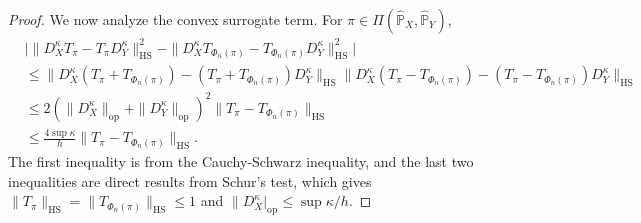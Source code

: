 \documentclass{article}
\begin{document}
\begin{proof}
	We now analyze the convex surrogate term. For $\pi \in \Pi(\hat{\mathbb{P}}_X,\hat{\mathbb{P}}_Y)$,
	\begin{align*}
		&\Big\vert \|D_X^\kappa T_{\pi} - T_{\pi} D_Y^\kappa \|_{\mathrm{HS}}^2 - \|D_X^\kappa T_{\Phi_n(\pi)} - T_{\Phi_n(\pi)} D_Y^\kappa \|_{\mathrm{HS}}^2 \Big\vert \\
		&\leq \| D_X^\kappa(T_\pi + T_{\Phi_n(\pi)}) - (T_{\pi} + T_{\Phi_n(\pi)})D_Y^\kappa \|_{\mathrm{HS}}\| D_X^\kappa(T_\pi - T_{\Phi_n(\pi)}) - (T_{\pi} - T_{\Phi_n(\pi)})D_Y^\kappa \|_{\mathrm{HS}} \\
		&\leq 2(\|D_X^\kappa\|_{\mathrm{op}} + \|D_Y^\kappa\|_{\mathrm{op}})^2 \|T_{\pi} - T_{\Phi_n(\pi)} \|_{\mathrm{HS}} \\
		&\leq \frac{4\sup\kappa}{h}\|T_{\pi} - T_{\Phi_n(\pi)} \|_{\mathrm{HS}} .
	\end{align*}
	The first inequality is from the Cauchy-Schwarz inequality, and the last two inequalities are direct results from Schur's test, which gives $\|T_{\pi}\|_{\mathrm{HS}} = \|T_{\Phi_n(\pi)}\|_{\mathrm{HS}} \leq 1$ and $\|D_X^\kappa|_{\mathrm{op}} \leq \sup\kappa/h$.
	

\end{proof}
\end{document}
